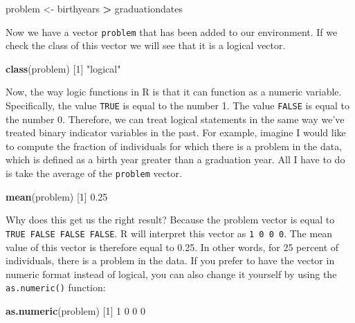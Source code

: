 \documentclass[
]{book}
\newenvironment{Shaded}{\begin{snugshade}}{\end{snugshade}}
\newcommand{\DecValTok}[1]{\textcolor[rgb]{0.00,0.00,0.81}{#1}}
\newcommand{\FloatTok}[1]{\textcolor[rgb]{0.00,0.00,0.81}{#1}}
\newcommand{\FunctionTok}[1]{\textcolor[rgb]{0.13,0.29,0.53}{\textbf{#1}}}
\newcommand{\NormalTok}[1]{#1}
\newcommand{\OtherTok}[1]{\textcolor[rgb]{0.56,0.35,0.01}{#1}}
\newcommand{\SpecialCharTok}[1]{\textcolor[rgb]{0.81,0.36,0.00}{\textbf{#1}}}
\newcommand{\StringTok}[1]{\textcolor[rgb]{0.31,0.60,0.02}{#1}}
\begin{document}
\begin{Shaded}
\begin{Highlighting}[]
\NormalTok{problem }\OtherTok{\textless{}{-}}\NormalTok{ birthyears }\SpecialCharTok{\textgreater{}}\NormalTok{ graduationdates}
\end{Highlighting}
\end{Shaded}

Now we have a vector \texttt{problem} that has been added to our environment. If we check the class of this vector we will see that it is a logical vector.

\begin{Shaded}
\begin{Highlighting}[]
\FunctionTok{class}\NormalTok{(problem)}
\NormalTok{[}\DecValTok{1}\NormalTok{] }\StringTok{"logical"}
\end{Highlighting}
\end{Shaded}

Now, the way logic functions in R is that it can function as a numeric variable. Specifically, the value \texttt{TRUE} is equal to the number 1. The value \texttt{FALSE} is equal to the number 0. Therefore, we can treat logical statements in the same way we've treated binary indicator variables in the past. For example, imagine I would like to compute the fraction of individuals for which there is a problem in the data, which is defined as a birth year greater than a graduation year. All I have to do is take the average of the \texttt{problem} vector.

\begin{Shaded}
\begin{Highlighting}[]
\FunctionTok{mean}\NormalTok{(problem)}
\NormalTok{[}\DecValTok{1}\NormalTok{] }\FloatTok{0.25}
\end{Highlighting}
\end{Shaded}

Why does this get us the right result? Because the problem vector is equal to \texttt{TRUE\ FALSE\ FALSE\ FALSE}. R will interpret this vector as \texttt{1\ 0\ 0\ 0}. The mean value of this vector is therefore equal to 0.25. In other words, for 25 percent of individuals, there is a problem in the data. If you prefer to have the vector in numeric format instead of logical, you can also change it yourself by using the \texttt{as.numeric()} function:

\begin{Shaded}
\begin{Highlighting}[]
\FunctionTok{as.numeric}\NormalTok{(problem)}
\NormalTok{[}\DecValTok{1}\NormalTok{] }\DecValTok{1} \DecValTok{0} \DecValTok{0} \DecValTok{0}
\end{Highlighting}
\end{Shaded}
\end{document}

